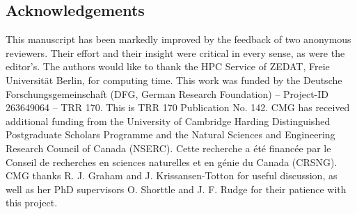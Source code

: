 \vspace{2cm}

\subsection*{Acknowledgements}

This manuscript has been markedly improved by the feedback of two anonymous reviewers. Their effort and their insight were critical in every sense, as were the editor's. The authors would like to thank the HPC Service of ZEDAT, Freie Universit\"{a}t Berlin, for computing time. This work was funded by the Deutsche Forschungsgemeinschaft (DFG, German Research Foundation) -- Project-ID 263649064 -- TRR 170. This is TRR 170 Publication No. 142. CMG has received additional funding from the University of Cambridge Harding Distinguished Postgraduate Scholars Programme and the Natural Sciences and Engineering Research Council of Canada (NSERC). Cette recherche a \'{e}t\'{e} financ\'{e}e par le Conseil de recherches en sciences naturelles et en g\'{e}nie du Canada (CRSNG). CMG thanks R. J. Graham and J. Krissansen-Totton for useful discussion, as well as her PhD supervisors O. Shorttle and J. F. Rudge for their patience with this project. 




